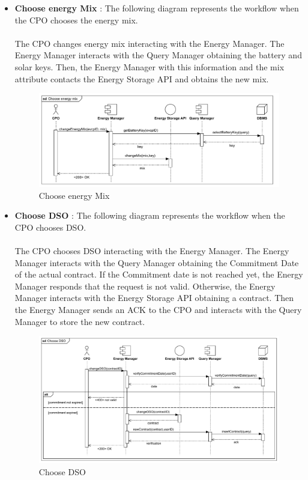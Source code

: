 \begin{itemize}
    \item \textbf{Choose energy Mix} : The following diagram represents the workflow when the CPO chooses the energy mix.\\
          \\ The CPO changes energy mix interacting with the Energy Manager. The Energy Manager interacts with the Query Manager obtaining the battery and solar keys.
          Then, the Energy Manager with this information and the mix attribute contacts the Energy Storage API and obtains the new mix.
          \begin{figure}[H]
              \centering
              \includegraphics[scale=0.55]{src/runtimeView/CPMS_energyMix.pdf}
              \caption{Choose energy Mix}
          \end{figure}
    \item \textbf{Choose DSO} : The following diagram represents the workflow when the CPO chooses DSO.\\
          \\ The CPO chooses DSO interacting with the Energy Manager. The Energy Manager interacts with the Query Manager obtaining the Commitment Date of the actual contract.
          If the Commitment date is not reached yet, the Energy Manager responds that the request is not valid.
          Otherwise, the Energy Manager interacts with the Energy Storage API obtaining a contract. Then the Energy Manager sends an ACK to the CPO and interacts with the
          Query Manager to store the new contract.
          \begin{figure}[H]
              \centering
              \includegraphics[scale=0.55]{src/runtimeView/CPMS_chooseDSO.pdf}
              \caption{Choose DSO}
          \end{figure}



\end{itemize}

